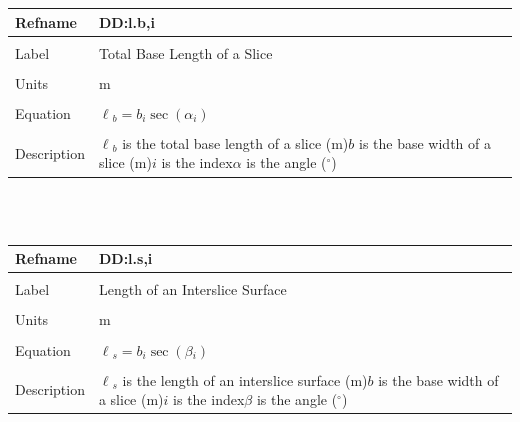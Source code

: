 \documentclass[12pt]{article}
\begin{document}
\noindent \begin{minipage}{\textwidth}
\begin{tabular}{p{} p{}}
\toprule \textbf{Refname} & \textbf{DD:l.b,i}
\label{DD:l.b,i}
\\ \midrule \\
Label & Total Base Length of a Slice
\\ \midrule \\
Units & m
\\ \midrule \\
Equation & ${\ell{}_{b}}=b_{i} \sec\left(\alpha{}_{i}\right)$
\\ \midrule \\
Description & ${\ell{}_{b}}$ is the total base length of a slice (m)\newline$b$ is the base width of a slice (m)\newline$i$ is the index\newline$\alpha{}$ is the angle (${}^{\circ}$)
\\ \bottomrule \end{tabular}
\end{minipage}\\
~\newline
\noindent \begin{minipage}{\textwidth}
\begin{tabular}{p{} p{}}
\toprule \textbf{Refname} & \textbf{DD:l.s,i}
\label{DD:l.s,i}
\\ \midrule \\
Label & Length of an Interslice Surface
\\ \midrule \\
Units & m
\\ \midrule \\
Equation & ${\ell{}_{s}}=b_{i} \sec\left(\beta{}_{i}\right)$
\\ \midrule \\
Description & ${\ell{}_{s}}$ is the length of an interslice surface (m)\newline$b$ is the base width of a slice (m)\newline$i$ is the index\newline$\beta{}$ is the angle (${}^{\circ}$)
\\ \bottomrule \end{tabular}
\end{minipage}\\
~\newline
\end{document}
